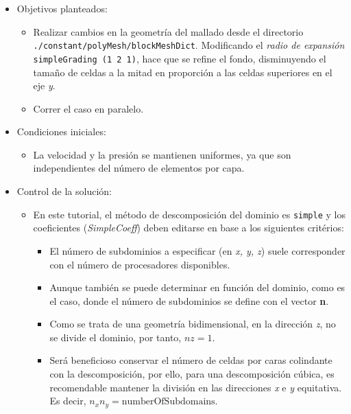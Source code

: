 \begin{itemize}
\item
  Objetivos planteados:

  \begin{itemize}
  \item
    Realizar cambios en la geometría del mallado desde el directorio
    \lstinline[style=bash]{./constant/polyMesh/blockMeshDict}.
    Modificando el \emph{radio de expansión}
    \lstinline[style=c++]{simpleGrading (1 2 1)}, hace que se refine el fondo,
    disminuyendo el tamaño de celdas a la mitad en proporción a las
    celdas superiores en el eje \emph{y}.
  \item
    Correr el caso en paralelo.
  \end{itemize}
\item
  Condiciones iniciales:

  \begin{itemize}
  \item
    La velocidad y la presión se mantienen uniformes, ya que son
    independientes del número de elementos por capa.
  \end{itemize}
\item
  Control de la solución:

  \begin{itemize}
  \item
    En este tutorial, el método de descomposición del dominio es
    \texttt{simple} y los coeficientes (\emph{SimpleCoeff}) deben
    editarse en base a los siguientes critérios:

    \begin{itemize}
    \item
      El número de subdominios a especificar (en \emph{x, y, z}) suele
      corresponder con el número de procesadores disponibles.
    \item
      Aunque también se puede determinar en función del dominio, como es
      el caso, donde el número de subdominios se define con el vector
      \textbf{n}.
    \item
      Como se trata de una geometría bidimensional, en la dirección
      \emph{z}, no se divide el dominio, por tanto, \(nz=1\).
    \item
      Será beneficioso conservar el número de celdas por caras
      colindante con la descomposición, por ello, para una
      descomposición cúbica, es recomendable mantener la división en las
      direcciones \emph{x} e \emph{y} equitativa. Es decir,
      \(n_xn_y= \text{numberOfSubdomains}\).
    \end{itemize}
  \end{itemize}
\end{itemize}

